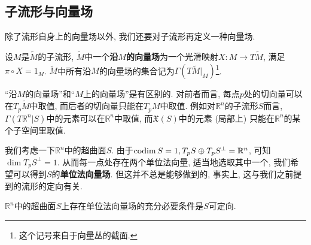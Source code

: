 \subsection*{子流形与向量场}
除了流形自身上的向量场以外, 我们还要对子流形再定义一种向量场.
\begin{defn}
    设$M$是$\widetilde{M}$的子流形, $\widetilde{M}$中一个\textbf{沿$M$的向量场}为一个光滑映射$X:M\to T\widetilde{M}$, 满足$\pi\circ X=1_M$.
    $\widetilde{M}$中所有沿$M$的向量场的集合记为$\Gamma(T\widetilde{M}|_M)$\footnote{这个记号来自于向量丛的截面.}.
\end{defn}
\begin{rem}
    ``沿$M$的向量场''和``$M$上的向量场''是有区别的.
    对前者而言, 每点$p$处的切向量可以在$T_p\widetilde{M}$中取值, 而后者的切向量只能在$T_pM$中取值.
    例如对$\mathbb{R}^n$的子流形$S$而言, $\Gamma(T\mathbb{R}^n|S)$中的元素可以在$\mathbb{R}^n$中取值,
    而$\mathfrak{X}(S)$中的元素 (局部上) 只能在$\mathbb{R}^n$的某个子空间里取值.
\end{rem}
我们考虑一下$\mathbb{R}^n$中的超曲面$S$.
由于$\operatorname{codim}{S}=1,T_pS\oplus T_pS^\perp=\mathbb{R}^n$, 可知$\dim{T_pS^\perp}=1$.
从而每一点处存在两个单位法向量, 适当地选取其中一个, 我们希望可以得到$S$的\textbf{单位法向量场}.
但这并不总是能够做到的, 事实上, 这与我们之前提到的流形的定向有关.
\begin{thm}\label{orientable iff normal field}
    $\mathbb{R}^n$中的超曲面$S$上存在单位法向量场的充分必要条件是$S$可定向.
\end{thm}
